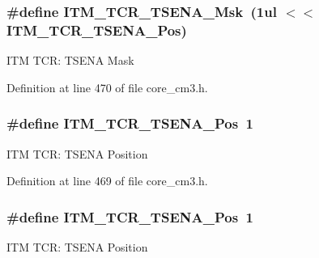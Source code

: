 \subsubsection[{\texorpdfstring{I\+T\+M\+\_\+\+T\+C\+R\+\_\+\+T\+S\+E\+N\+A\+\_\+\+Msk}{ITM_TCR_TSENA_Msk}}]{\setlength{\rightskip}{0pt plus 5cm}\#define I\+T\+M\+\_\+\+T\+C\+R\+\_\+\+T\+S\+E\+N\+A\+\_\+\+Msk~(1ul $<$$<$ I\+T\+M\+\_\+\+T\+C\+R\+\_\+\+T\+S\+E\+N\+A\+\_\+\+Pos)}\hypertarget{group___c_m_s_i_s___c_m3___i_t_m_ga436b2e8fa24328f48f2da31c00fc9e65}{}\label{group___c_m_s_i_s___c_m3___i_t_m_ga436b2e8fa24328f48f2da31c00fc9e65}
I\+TM T\+CR\+: T\+S\+E\+NA Mask 

Definition at line 470 of file core\+\_\+cm3.\+h.

\subsubsection[{\texorpdfstring{I\+T\+M\+\_\+\+T\+C\+R\+\_\+\+T\+S\+E\+N\+A\+\_\+\+Pos}{ITM_TCR_TSENA_Pos}}]{\setlength{\rightskip}{0pt plus 5cm}\#define I\+T\+M\+\_\+\+T\+C\+R\+\_\+\+T\+S\+E\+N\+A\+\_\+\+Pos~1}\hypertarget{group___c_m_s_i_s___c_m3___i_t_m_ga5aa381845f810114ab519b90753922a1}{}\label{group___c_m_s_i_s___c_m3___i_t_m_ga5aa381845f810114ab519b90753922a1}
I\+TM T\+CR\+: T\+S\+E\+NA Position 

Definition at line 469 of file core\+\_\+cm3.\+h.

\subsubsection[{\texorpdfstring{I\+T\+M\+\_\+\+T\+C\+R\+\_\+\+T\+S\+E\+N\+A\+\_\+\+Pos}{ITM_TCR_TSENA_Pos}}]{\setlength{\rightskip}{0pt plus 5cm}\#define I\+T\+M\+\_\+\+T\+C\+R\+\_\+\+T\+S\+E\+N\+A\+\_\+\+Pos~1}\hypertarget{group___c_m_s_i_s___c_m3___i_t_m_ga5aa381845f810114ab519b90753922a1}{}\label{group___c_m_s_i_s___c_m3___i_t_m_ga5aa381845f810114ab519b90753922a1}
I\+TM T\+CR\+: T\+S\+E\+NA Position 

